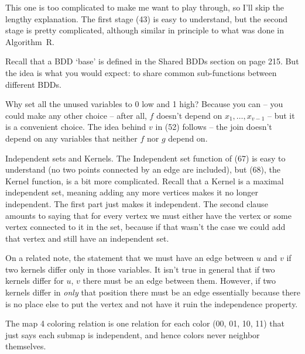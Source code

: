 \vskip 0.08in 
This one is too complicated to make me want to play through, so
I'll skip the lengthy explanation.  The first stage (43) is easy
to understand, but the second stage is pretty complicated, although
similar in principle to what was done in Algorithm~R.

\vskip 0.08in 

\noindent Recall that a BDD `base' is defined in the Shared BDDs section
on page 215.  But the idea is what you would expect: to share
common sub-functions between different BDDs.

\noindent [p 225] Why set all the unused variables to 0 low
and 1 high?  Because you can -- you could make any other
choice -- after all, $f$ doesn't depend on $x_1, \ldots, x_{v-1}$ --
but it is a convenient choice.  The idea behind $v$ in (52) follows --
the join doesn't depend on any variables that neither $f$ nor $g$
depend on.

\vskip 0.08in 

\noindent [p231] Independent sets and Kernels.  The Independent
set function of (67) is easy to understand (no two points connected
by an edge are included), but (68), the Kernel function, is a bit
more complicated.  Recall that a Kernel is a maximal independent set,
meaning adding any more vertices makes it no longer independent.
The first part just makes it independent.  The second clause amounts
to saying that for every vertex we must either have the vertex or
some vertex connected to it in the set, because if that wasn't the case 
we could add that vertex and still have an independent set.

On a related note, the statement that we must have an edge between
$u$ and $v$ if two kernels differ only in those variables.  It isn't
true in general that if two kernels differ for $u$, $v$ there must be 
an edge between them. However, if two kernels differ in {\it only} that
position there must be an edge essentially because there is no place
else to put the vertex and not have it ruin the independence property.

\vskip 0.08in 

\noindent [p 233] The map 4 coloring relation is one relation
for each color (00, 01, 10, 11) that just says each submap
is independent, and hence colors never neighbor themselves.

\vskip 0.08in 

